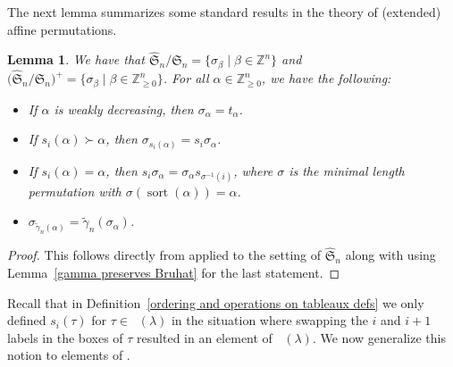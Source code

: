 \documentclass[pdftex]{sigma}
\numberwithin{equation}{section}
\newtheorem{Lemma}[Theorem]{Lemma}
\theoremstyle{definition}
\DeclareMathOperator{\PSYT}{\mathrm{PSYT}_{\geq 0}}
\DeclareMathOperator{\sort}{sort}
\begin{document}
The next lemma summarizes some standard results in the theory of (extended) affine permutations.

\begin{Lemma}\label{min coset reps Lemma}\label{properties of min length rep}
 We have that
$
 \widehat{\mathfrak{S}}_n/\mathfrak{S}_n= \{ \sigma_{\beta} \mid \beta \in \mathbb{Z}^n \}
$
 and
$
 \bigl(\widehat{\mathfrak{S}}_n/\mathfrak{S}_n \bigr)^{+}= \{ \sigma_{\beta} \mid \beta \in \mathbb{Z}^n_{\geq 0} \}$.
 For all $\alpha \in \mathbb{Z}^{n}_{\geq 0}$, we have the following:
 \begin{itemize}\itemsep=0pt
 \item If $\alpha$ is weakly decreasing, then $\sigma_{\alpha} = t_{\alpha}$.
 \item If $s_i(\alpha) \succ \alpha$, then $\sigma_{s_i(\alpha)}= s_i\sigma_{\alpha}$.
 \item If $s_i(\alpha) = \alpha$, then $s_i\sigma_{\alpha} = \sigma_{\alpha} s_{\sigma^{-1}(i)}$, where $\sigma$ is the minimal length permutation with $\sigma(\sort(\alpha))= \alpha$.
 \item $\sigma_{\widetilde{\gamma}_n(\alpha)} = \widetilde{\gamma}_n (\sigma_{\alpha})$.
 \end{itemize}
\end{Lemma}
\begin{proof}
 This follows directly from \cite[Proposition~2.1]{Stembridge} applied to the setting of $\widehat{\mathfrak{S}}_n$ along with using Lemma~\ref{gamma preserves Bruhat} for the last statement.
\end{proof}

Recall that in Definition~\ref{ordering and operations on tableaux defs} we only defined $s_i(\tau)$ for $\tau \in \PSYT(\lambda)$ in the situation where swapping the $i$ and $i+1$ labels in the boxes of $\tau$ resulted in an element of $\PSYT(\lambda)$. We now generalize this notion to elements of .
\end{document}
